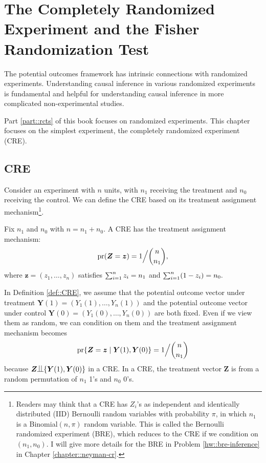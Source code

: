 
\chapter{The Completely Randomized Experiment and the Fisher Randomization Test}\label{ch::frt-cre}


The potential outcomes framework has intrinsic connections with randomized experiments. Understanding causal inference in various randomized experiments is fundamental and helpful for understanding causal inference in more complicated non-experimental studies.  


Part \ref{part::rcts} of this book focuses on randomized experiments. This chapter focuses on the simplest experiment, the completely randomized experiment (CRE). 

\section{CRE}

Consider an experiment with $n$ units, with $n_1$ receiving the treatment and $n_0$ receiving the control. We can define the CRE based on its treatment assignment mechanism\footnote{Readers may think that a CRE has $Z_i$'s as independent and identically distributed (IID) Bernoulli random variables with probability $\pi$, in which $n_1$ is a Binomial$(n,\pi)$ random variable. This is called the Bernoulli randomized experiment (BRE), which reduces to the CRE if we condition on $(n_1, n_0)$.
I will give more details for the BRE in Problem \ref{hw::bre-inference} in Chapter \ref{chapter::neyman-cr}. 
}.

\begin{definition}
[CRE]\label{def::CRE}
Fix $n_1$ and $n_0$ with $n = n_1 + n_0$.
A CRE has the treatment assignment mechanism:
$$
\textup{pr}(  \bm{Z} = \bm{z} ) = 1 \Big / \binom{n}{n_1},
$$
where $\bm{z} = (z_1,\ldots, z_n)$ satisfies $\sum_{i=1}^n z_i  = n_1$ and $\sum_{i=1}^n (1-z_i)  = n_0 . $
\end{definition}


In Definition \ref{def::CRE}, we assume that the potential outcome vector under treatment $\bm{Y}(1) = (Y_1(1), \ldots, Y_n(1) )$ and the potential outcome vector under control $\bm{Y}(0) = (Y_1(0), \ldots, Y_n(0) )$ are both fixed. Even if we view them as random, we can condition on them and the treatment assignment mechanism becomes 
$$
\textup{pr}\{    \bm{Z} = \bm{z} \mid \bm{Y}(1), \bm{Y}(0)  \} = 1 \Big / \binom{n}{n_1} 
$$
because $ \bm{Z} \ind \{\bm{Y}(1), \bm{Y}(0)\}$ in a CRE. In a CRE, the treatment vector $\bm{Z}$ is from a random permutation of $n_1$ 1's and $n_0$ 0's.

